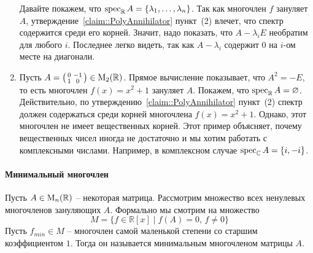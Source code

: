 \begin{enumerate}
Давайте покажем, что $\operatorname{spec}_\mathbb R A = \{\lambda_1,\ldots, \lambda_n\}$.
Так как многочлен $f$ зануляет $A$, утверждение~\ref{claim::PolyAnnihilator} пункт~(2) влечет, что спектр содержится среди его корней.
Значит, надо показать, что $A-\lambda_i E$ необратим для любого $i$.
Последнее легко видеть, так как $A-\lambda_i$ содержит $0$ на $i$-ом месте на диагонали.

\item Пусть $A=\left(\begin{smallmatrix}{0}&{-1}\\{1}&{0}\end{smallmatrix}\right)\in\operatorname{M}_{2}(\mathbb R)$.
Прямое вычисление показывает, что $A^2 = -E$, то есть многочлен $f(x) = x^2 + 1$ зануляет $A$.
Покажем, что $\operatorname{spec}_\mathbb R A = \varnothing$.
Действительно, по утверждению~\ref{claim::PolyAnnihilator} пункт~(2) спектр должен содержаться среди корней многочлена $f(x) = x^2 + 1$.
Однако, этот многочлен не имеет вещественных корней.
Этот пример объясняет, почему вещественных чисел иногда не достаточно и мы хотим работать с комплексными числами.
Например, в комплексном случае $\operatorname{spec}_\mathbb C A = \{i, - i\}$.
\end{enumerate}

\paragraph{Минимальный многочлен}

Пусть $A\in\operatorname{M}_{n}(\mathbb R)$ -- некоторая матрица.
Рассмотрим множество всех ненулевых многочленов зануляющих $A$.
Формально мы смотрим на множество
\[
M = \{f\in\mathbb R[x]\mid f(A)=0,\,f\neq 0\}
\]
Пусть $f_{min}\in M$ -- многочлен самой маленькой степени со старшим коэффициентом $1$.
Тогда он называется минимальным многочленом матрицы $A$.

